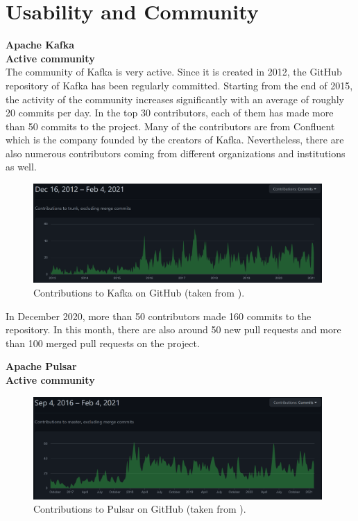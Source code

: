 \section{Usability and Community} \label{section:usability}
\large \textbf{Apache Kafka}\\
\normalsize
\textbf{Active community}\\
The community of Kafka is very active. Since it is created in 2012, the GitHub repository of Kafka has been regularly committed. Starting from the end of 2015, the activity of the community increases significantly with an average of roughly 20 commits per day. In the top 30 contributors, each of them has made more than 50 commits to the project. Many of the contributors are from Confluent which is the company founded by the creators of Kafka. Nevertheless, there are also numerous contributors coming from different organizations and institutions as well.

\begin{figure}[h]
	\centering
	\includegraphics[width=11cm]{images/community-kafka.png}
	\caption{Contributions to Kafka on GitHub (taken from \cite{kafkarepo}).}
	\label{fig:communitykafka}
\end{figure}

In December 2020, more than 50 contributors made 160 commits to the repository. In this month, there are also around 50 new pull requests and more than 100 merged pull requests on the project.

\large \textbf{Apache Pulsar}\\
\normalsize
\textbf{Active community}\\
\begin{figure}[h]
	\centering
	\includegraphics[width=11cm]{images/community-pulsar.png}
	\caption{Contributions to Pulsar on GitHub (taken from \cite{pulsarrepo}).}
	\label{fig:communitypulsar}
\end{figure}

